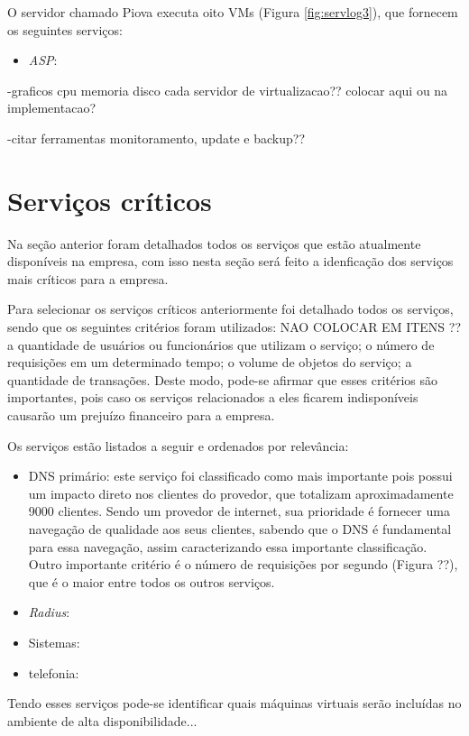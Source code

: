 O servidor chamado Piova executa oito \ac{VM}s (Figura \ref{fig:servlog3}), que fornecem os seguintes serviços:
\begin{itemize}
 \item \textit{ASP}: 
 
\end{itemize}


-graficos cpu memoria disco cada servidor de virtualizacao?? colocar aqui ou na implementacao?

-citar ferramentas monitoramento, update e backup??

\section{Serviços críticos}
\label{section:servcrit}

Na seção anterior foram detalhados todos os serviços que estão atualmente disponíveis na empresa, com isso nesta seção será feito a idenficação
dos serviços mais críticos para a empresa.

Para selecionar os serviços críticos anteriormente foi detalhado todos os serviços, sendo que os seguintes critérios foram utilizados: 
NAO COLOCAR EM ITENS ?? 
a quantidade de usuários ou funcionários que utilizam o serviço; 
o número de requisições em um determinado tempo;
o volume de objetos do serviço;
a quantidade de transações.
Deste modo, pode-se afirmar que esses critérios são importantes, pois caso os serviços relacionados a eles ficarem indisponíveis causarão 
um prejuízo financeiro para a empresa. 

Os serviços estão listados a seguir e ordenados por relevância:
\begin{itemize}
 \item \ac{DNS} primário: este serviço foi classificado como mais importante pois possui um impacto direto nos clientes do provedor, que 
 totalizam aproximadamente 9000 clientes. Sendo um provedor de internet, sua prioridade é fornecer uma navegação de qualidade aos seus clientes, 
 sabendo que o \ac{DNS} é fundamental para essa navegação, assim caracterizando essa importante classificação. Outro importante critério é
 o número de requisições por segundo (Figura ??), que é o maior entre todos os outros serviços.
 \item \textit{Radius}: 
 \item Sistemas: 
 \item telefonia: 
\end{itemize}

Tendo esses serviços pode-se identificar quais máquinas virtuais serão incluídas no ambiente de alta disponibilidade...


